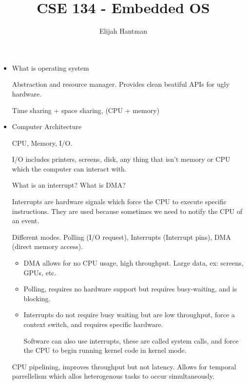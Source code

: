 \documentclass{report}
\title{\Huge{CSE 134 - Embedded OS}}
\author{\huge{Elijah Hantman}}
\date{}
\begin{document}
\maketitle
\newpage

\begin{itemize}
    \item What is operating system
        \begin{mdframed}
            Abstraction and resource manager. Provides clean beatiful
            APIs for ugly hardware.

            Time sharing + space sharing, (CPU + memory)
        \end{mdframed}
    \item Computer Architecture
        \begin{mdframed}
            CPU, Memory, I/O.

            I/O includes printers, screens, disk, any thing
            that isn't memory or CPU which the computer can interact
            with.


            What is an interrupt? What is DMA?

            Interrupts are hardware signals which force the CPU to execute
            specific instructions. They are used because sometimes we need
            to notify the CPU of an event.

            Different modes. Polling (I/O request), Interrupts (Interrupt pins),
            DMA (direct memory access).

            \begin{itemize}
                \item DMA allows for no CPU usage, high throughput.
                    Large data, ex: screens, GPUs, etc.
                \item Polling, requires no hardware support but requires busy-waiting,
                    and is blocking.
                \item Interrupts do not require busy waiting but are low throughput,
                    force a context switch, and requires specific hardware.

                    Software can also use interrupts, these are called system calls,
                    and force the CPU to begin running kernel code in kernel mode.
            \end{itemize}

            CPU pipelining, improves throughput but not latency. Allows for temporal
            parrellelism which allos heterogenous tasks to occur simultaneously.


\end{mdframed}
\end{itemize}
\end{document}
